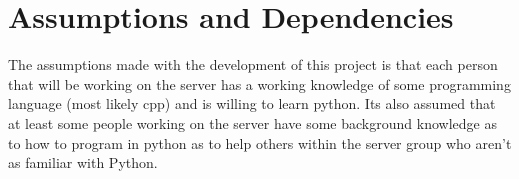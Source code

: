\section{Assumptions and
Dependencies}\label{assumptions-and-dependencies}
The assumptions made with the development of this project is that each
person that will be working on the server has a working knowledge of
some programming language (most likely \gls{cpp}) and is willing to learn
python. Its also assumed that at least some people working on the server
have some background knowledge as to how to program in python as to help
others within the server group who aren't as familiar with Python.

